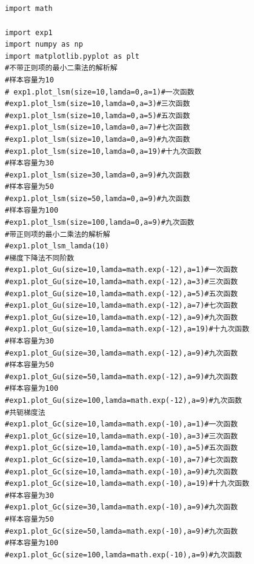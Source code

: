 \documentclass[lang=cn,a4paper,cite=authoryear]{elegantpaper}
\begin{document}
\subsection*{} 
\begin{verbatim}
import math

import exp1
import numpy as np
import matplotlib.pyplot as plt
#不带正则项的最小二乘法的解析解
#样本容量为10
# exp1.plot_lsm(size=10,lamda=0,a=1)#一次函数
#exp1.plot_lsm(size=10,lamda=0,a=3)#三次函数
#exp1.plot_lsm(size=10,lamda=0,a=5)#五次函数
#exp1.plot_lsm(size=10,lamda=0,a=7)#七次函数
#exp1.plot_lsm(size=10,lamda=0,a=9)#九次函数
#exp1.plot_lsm(size=10,lamda=0,a=19)#十九次函数
#样本容量为30
#exp1.plot_lsm(size=30,lamda=0,a=9)#九次函数
#样本容量为50
#exp1.plot_lsm(size=50,lamda=0,a=9)#九次函数
#样本容量为100
#exp1.plot_lsm(size=100,lamda=0,a=9)#九次函数
#带正则项的最小二乘法的解析解
#exp1.plot_lsm_lamda(10)
#梯度下降法不同阶数
#exp1.plot_Gu(size=10,lamda=math.exp(-12),a=1)#一次函数
#exp1.plot_Gu(size=10,lamda=math.exp(-12),a=3)#三次函数
#exp1.plot_Gu(size=10,lamda=math.exp(-12),a=5)#五次函数
#exp1.plot_Gu(size=10,lamda=math.exp(-12),a=7)#七次函数
#exp1.plot_Gu(size=10,lamda=math.exp(-12),a=9)#九次函数
#exp1.plot_Gu(size=10,lamda=math.exp(-12),a=19)#十九次函数
#样本容量为30
#exp1.plot_Gu(size=30,lamda=math.exp(-12),a=9)#九次函数
#样本容量为50
#exp1.plot_Gu(size=50,lamda=math.exp(-12),a=9)#九次函数
#样本容量为100
#exp1.plot_Gu(size=100,lamda=math.exp(-12),a=9)#九次函数
#共轭梯度法
#exp1.plot_Gc(size=10,lamda=math.exp(-10),a=1)#一次函数
#exp1.plot_Gc(size=10,lamda=math.exp(-10),a=3)#三次函数
#exp1.plot_Gc(size=10,lamda=math.exp(-10),a=5)#五次函数
#exp1.plot_Gc(size=10,lamda=math.exp(-10),a=7)#七次函数
#exp1.plot_Gc(size=10,lamda=math.exp(-10),a=9)#九次函数
#exp1.plot_Gc(size=10,lamda=math.exp(-10),a=19)#十九次函数
#样本容量为30
#exp1.plot_Gc(size=30,lamda=math.exp(-10),a=9)#九次函数
#样本容量为50
#exp1.plot_Gc(size=50,lamda=math.exp(-10),a=9)#九次函数
#样本容量为100
#exp1.plot_Gc(size=100,lamda=math.exp(-10),a=9)#九次函数
\end{verbatim}
\end{document}
